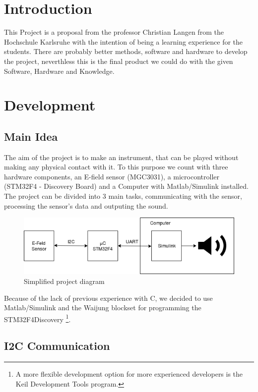 \documentclass{article}
\begin{document}
\section{Introduction}

\noindent This Project is a proposal from the professor Christian Langen from the Hochschule Karlsruhe with the intention of being a learning experience for the students. There are probably better methods, software and hardware to develop the project, neverthless this is the final product we could do with the given Software, Hardware and Knowledge. 

\section{Development}

\subsection{Main Idea}

\noindent The aim of the project is to make an instrument, that can be played without making any physical contact with it. To this purpose we count with three hardware components, an E-field sensor (MGC3031), a microcontroller (STM32F4 - Discovery Board) and a Computer with Matlab/Simulink installed. The project can be divided into 3 main tasks, communicating with the sensor, processing the sensor's data and outputing the sound.  

\begin{figure}[h]
\centering
\includegraphics[width=12cm]{MainIdea.png}  
\caption{Simplified project diagram}
\end{figure}

\noindent Because of the lack of previous experience with C, we decided to use Matlab/Simulink and the Waijung blockset for programming the STM32F4Discovery \footnote{A more flexible development option for more experienced developers is the Keil Development Tools program.}. 


\subsection{I2C Communication}
\end{document}
